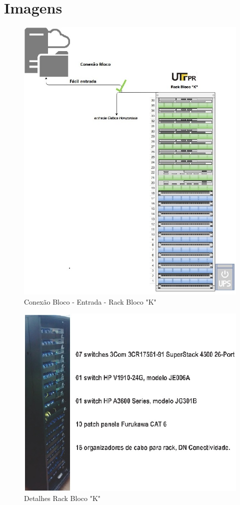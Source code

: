 \documentclass[	DIV=calc,%
paper=a4,%
fontsize=12pt,%
onecolumn]{scrartcl}	 					%
\begin{document}
	\section{Imagens}
	\begin{figure}[!h]
		\centering
		\caption{Conexão Bloco - Entrada - Rack Bloco "K"}
		\includegraphics{entrada_1}
	\end{figure}
	\begin{figure}[!h]
		\centering
		\caption{Detalhes Rack Bloco "K"}
		\includegraphics{rack_1}
	\end{figure}
\end{document}
